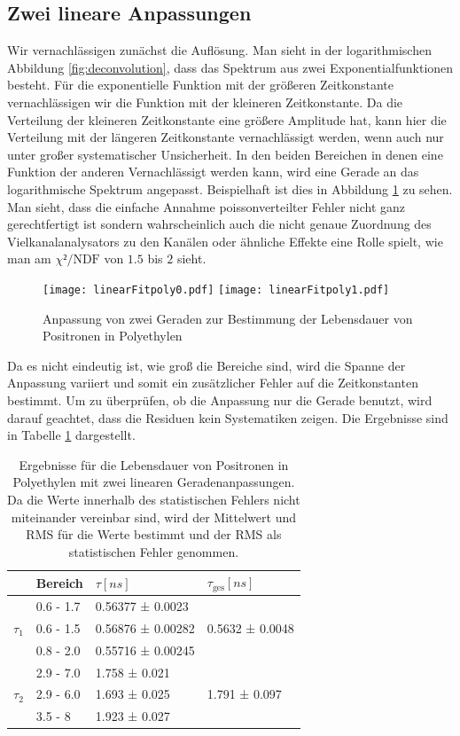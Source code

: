 \documentclass[a4paper,12pt]{article}
\begin{document}
\subsection{Zwei lineare Anpassungen}
Wir vernachlässigen zunächst die Auflösung.
Man sieht in der logarithmischen Abbildung \ref{fig:deconvolution}, dass das Spektrum aus zwei Exponentialfunktionen
besteht. Für die exponentielle Funktion mit der größeren Zeitkonstante vernachlässigen wir die
Funktion mit
der kleineren Zeitkonstante. Da die Verteilung der kleineren Zeitkonstante eine größere Amplitude
hat, kann hier die Verteilung mit der längeren Zeitkonstante vernachlässigt werden, wenn auch nur
unter großer systematischer Unsicherheit. In den beiden Bereichen in denen eine Funktion der anderen
Vernachlässigt werden kann, wird eine Gerade an das logarithmische Spektrum angepasst. Beispielhaft
ist dies in Abbildung \ref{fig:dualLinearFit} zu sehen. Man sieht, dass die einfache Annahme
poissonverteilter Fehler nicht ganz gerechtfertigt ist sondern wahrscheinlich auch die nicht genaue
Zuordnung des Vielkanalanalysators zu den Kanälen oder ähnliche Effekte eine Rolle spielt, wie man
am $χ²/\text{NDF}$ von $1.5$ bis $2$ sieht.
\begin{figure}
	\texttt{[image: linearFitpoly0.pdf]}
	\texttt{[image: linearFitpoly1.pdf]}
	\caption{Anpassung von zwei Geraden zur Bestimmung der Lebensdauer von Positronen in Polyethylen}
	\label{fig:dualLinearFit}
\end{figure}

Da es nicht eindeutig ist, wie groß die Bereiche sind, wird die Spanne der
Anpassung variiert und somit ein zusätzlicher Fehler auf die Zeitkonstanten bestimmt.
Um zu überprüfen, ob die Anpassung nur die Gerade benutzt, wird darauf geachtet, dass die Residuen
kein Systematiken zeigen.
Die Ergebnisse sind in Tabelle \ref{tab:linearPoly} dargestellt.

\begin{table}[h]
	\begin{tabular}{l |l l ||l}
			& Bereich & $τ [\si{ns}]$ & $τ_\text{ges} [\si{ns}]$ \\
		\hline
		\multirow{3}{*}{$τ_{1}$} &0.6 - 1.7&  0.56377 ± 0.0023  &\multirow{3}{*}{0.5632 ± 0.0048}\\
			 &0.6 - 1.5&  0.56876 ± 0.00282 &\\
			 &0.8 - 2.0&  0.55716 ± 0.00245 &\\
		\hline
		\multirow{3}{*}{$τ_2$} & 2.9 - 7.0 &  1.758 ± 0.021 &\multirow{3}{*}{1.791 ± 0.097}\\
			&2.9 - 6.0&  1.693 ± 0.025 & \\
			&3.5 - 8&  1.923 ± 0.027  &
	\end{tabular}
	\centering
	\caption{Ergebnisse für die Lebensdauer von Positronen in Polyethylen mit zwei linearen
		Geradenanpassungen. Da die Werte innerhalb des statistischen Fehlers nicht miteinander vereinbar sind, wird der Mittelwert und
	RMS für die Werte bestimmt und der RMS als statistischen Fehler genommen.}
	\label{tab:linearPoly}
\end{table}
\end{document}
